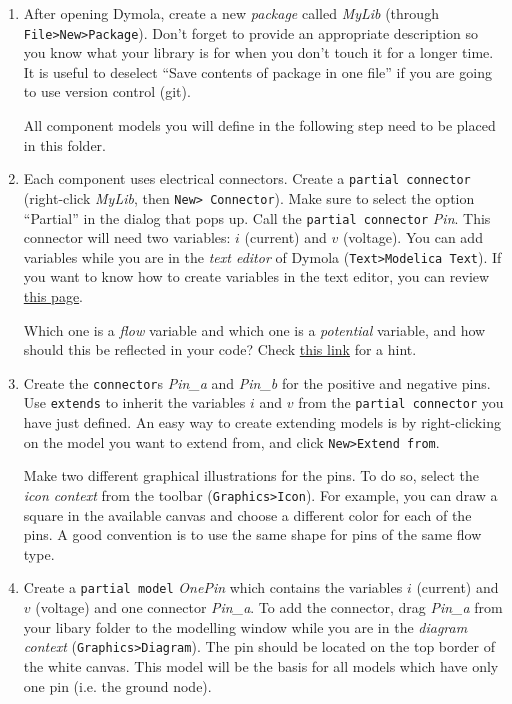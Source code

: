 \documentclass[10pt,a4paper]{article}
\begin{document}
\begin{enumerate}
	\item After opening Dymola, create a new \textit{package} called \textit{MyLib} (through \texttt{File>New>Package}). Don't forget to provide an appropriate description so you know what your library is for when you don't touch it for a longer time. It is useful to deselect ``Save contents of package in one file'' if you are going to use version control (git).
	
	All component models you will define in the following step need to be placed in this folder.
	
	\item Each component uses electrical connectors. Create a \texttt{partial connector} (right-click \textit{MyLib}, then \texttt{New> Connector}). Make sure to select the option ``Partial'' in the dialog that pops up. Call the \texttt{partial connector} \textit{Pin}. This connector will need two variables: $i$ (current) and $v$ (voltage). You can add variables while you are in the \textit{text editor} of Dymola (\texttt{Text>Modelica Text}). If you want to know how to create variables in the text editor, you can review \href{https://mbe.modelica.university/behavior/equations/variables/#variables}{this page}. 

	Which one is a \textit{flow} variable and which one is a \textit{potential} variable, and how should this be reflected in your code? Check 
	\href{https://mbe.modelica.university/components/connectors/simple_domains/#simple-domains}{this link} for a hint.
	
	\item Create the \texttt{connector}s \textit{Pin\_a} and \textit{Pin\_b} for the positive and negative pins. Use \texttt{extends} to inherit the variables $i$ and $v$ from the \texttt{partial connector} you have just defined. An easy way to create extending models is by right-clicking on the model you want to extend from, and click \texttt{New>Extend from}.
	
	Make two different graphical illustrations for the pins. To do so, select the \textit{icon context} from the toolbar (\texttt{Graphics>Icon}). For example, you can draw a square in the available canvas and choose a different color for each of the pins. A good convention is to use the same shape for pins of the same flow type. 
	
	\item Create a \texttt{partial model} \textit{OnePin} which contains the variables $i$ (current) and $v$ (voltage) and one connector \textit{Pin\_a}. To add the connector, drag \textit{Pin\_a} from your libary folder to the modelling window while you are in the \textit{diagram context} (\texttt{Graphics>Diagram}). The pin should be located on the top border of the white canvas. This model will be the basis for all models which have only one pin (i.e. the ground node).
	

\end{enumerate}
\end{document}
